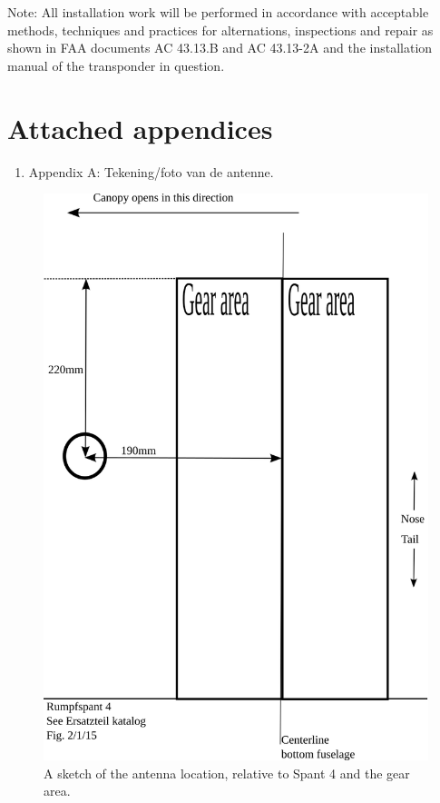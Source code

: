 \documentclass{article}
\begin{document}
Note:
All installation work will be performed in accordance with acceptable methods, techniques and practices for alternations, inspections and repair as shown in FAA documents AC 43.13.B and AC 43.13-2A and the installation manual of the transponder in question.

\section{Attached appendices}
\begin{enumerate}
\item Appendix A: Tekening/foto van de antenne.
\end{enumerate}

\begin{figure}
\includegraphics[width=\textwidth,keepaspectratio]{antenna_location}
\caption{A sketch of the antenna location, relative to Spant 4 and the gear area.}
\label{fig:antenna_location}
\end{figure}
\end{document}
